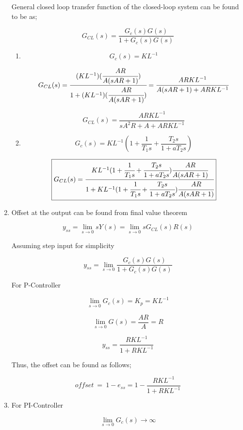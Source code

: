 \documentclass[a4paper,12pt]{article}
\begin{document}
\begin{enumerate}
		
			General closed loop transfer function of the closed-loop system can be found to be as;
			
			$$G_{CL}(s)=\frac{G_c(s)G(s)}{1+G_c(s)G(s)}$$
			\begin{enumerate}
				
			
				
				\item 
				
					$$ G_c(s)= KL^{-1} $$
					
					$$ G_{CL}(s)=\cfrac{(KL^{-1})(\cfrac{AR}{A(sAR+1)})}{1+(KL^{-1})(\cfrac{AR}{A(sAR+1)})} = \cfrac{ARKL^{-1}}{A(sAR+1)+ARKL^{-1}}$$
					
					$$\boxed{ 	G_{CL}(s)= \frac{ARKL^{-1}}{sA^2R+A+ARKL^{-1}} }$$ 
					
					
						
				
				\item 
				
					$$ G_c(s)= KL^{-1}(1+\frac{1}{T_1s}+\frac{T_2s}{1+aT_2s})$$
					
					$$\boxed{ G_{CL}(s)=\cfrac{KL^{-1}(1+\cfrac{1}{T_1s}+\cfrac{T_2s}{1+aT_2s})\cfrac{AR}{A(sAR+1)}}{1+KL^{-1}(1+\cfrac{1}{T_1s}+\cfrac{T_2s}{1+aT_2s})\cfrac{AR}{A(sAR+1)}} }$$
					
					
			\end{enumerate}
		
		
		\item Offset at the output can be found from final value theorem
			
			$$ y_{ss}=\lim_{s \to 0}sY(s) = \lim_{s \to 0}sG_{CL}(s)R(s)$$
			
			Assuming step input for simplicity
			
			$$ y_{ss} = \lim_{s \to 0} \frac{G_c(s)G(s)}{1+G_c(s)G(s)}$$
			
			For P-Controller
			
				$$ 	\lim_{s \to 0} G_c(s)=K_p=KL^{-1} $$			
				
				$$ \lim_{s \to 0} G(s)=\frac{AR}{A}=R $$
				
				$$ y_{ss}= \frac{RKL^{-1}}{1+RKL^{-1}} $$
					
				Thus, the offset can be found as follows;
				
				$$\boxed{ offset\ =\ 1-e_{ss}=1- \frac{RKL^{-1}}{1+RKL^{-1}} }$$
				
		\item For PI-Controller
			
			$$ 	\lim_{s \to 0} G_c(s) \to \infty $$			
				

\end{enumerate}
\end{document}
